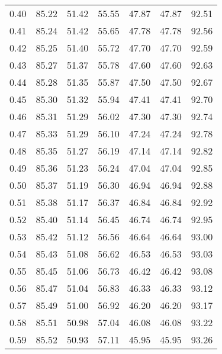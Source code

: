 \begin{tabular}{|c|c|c|c|c|c|c|}
      0.40 &     85.22 &     51.42 &      55.55 &   47.87 &      47.87 &         92.51 \\
      0.41 &     85.24 &     51.42 &      55.65 &   47.78 &      47.78 &         92.56 \\
      0.42 &     85.25 &     51.40 &      55.72 &   47.70 &      47.70 &         92.59 \\
      0.43 &     85.27 &     51.37 &      55.78 &   47.60 &      47.60 &         92.63 \\
      0.44 &     85.28 &     51.35 &      55.87 &   47.50 &      47.50 &         92.67 \\
      0.45 &     85.30 &     51.32 &      55.94 &   47.41 &      47.41 &         92.70 \\
      0.46 &     85.31 &     51.29 &      56.02 &   47.30 &      47.30 &         92.74 \\
      0.47 &     85.33 &     51.29 &      56.10 &   47.24 &      47.24 &         92.78 \\
      0.48 &     85.35 &     51.27 &      56.19 &   47.14 &      47.14 &         92.82 \\
      0.49 &     85.36 &     51.23 &      56.24 &   47.04 &      47.04 &         92.85 \\
      0.50 &     85.37 &     51.19 &      56.30 &   46.94 &      46.94 &         92.88 \\
      0.51 &     85.38 &     51.17 &      56.37 &   46.84 &      46.84 &         92.92 \\
      0.52 &     85.40 &     51.14 &      56.45 &   46.74 &      46.74 &         92.95 \\
      0.53 &     85.42 &     51.12 &      56.56 &   46.64 &      46.64 &         93.00 \\
      0.54 &     85.43 &     51.08 &      56.62 &   46.53 &      46.53 &         93.03 \\
      0.55 &     85.45 &     51.06 &      56.73 &   46.42 &      46.42 &         93.08 \\
      0.56 &     85.47 &     51.04 &      56.83 &   46.33 &      46.33 &         93.12 \\
      0.57 &     85.49 &     51.00 &      56.92 &   46.20 &      46.20 &         93.17 \\
      0.58 &     85.51 &     50.98 &      57.04 &   46.08 &      46.08 &         93.22 \\
      0.59 &     85.52 &     50.93 &      57.11 &   45.95 &      45.95 &         93.26 \\

\end{tabular}
